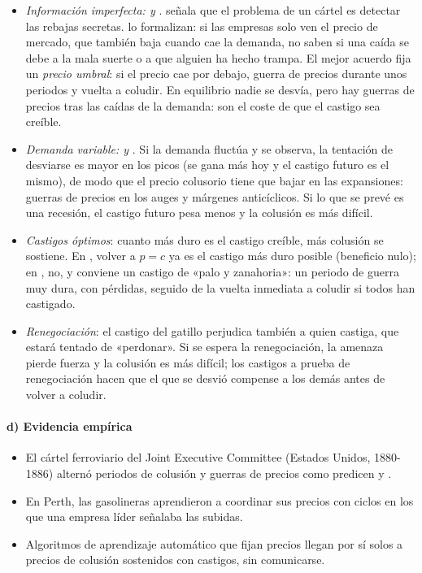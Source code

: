 \documentclass[11pt]{article}
\begin{document}
\begin{itemize}
\item \emph{Información imperfecta:  y }. \textcite{Stigler1964Theory} señala que el problema de un cártel es detectar las rebajas secretas. \textcite{GreenPorter1984Noncooperative} lo formalizan: si las empresas solo ven el precio de mercado, que también baja cuando cae la demanda, no saben si una caída se debe a la mala suerte o a que alguien ha hecho trampa. El mejor acuerdo fija un \emph{precio umbral}: si el precio cae por debajo, guerra de precios durante unos periodos y vuelta a coludir. En equilibrio nadie se desvía, pero hay guerras de precios tras las caídas de la demanda: son el coste de que el castigo sea creíble.
\item \emph{Demanda variable:  y }. Si la demanda fluctúa y se observa, la tentación de desviarse es mayor en los picos (se gana más hoy y el castigo futuro es el mismo), de modo que el precio colusorio tiene que bajar en las expansiones: guerras de precios en los auges y márgenes anticíclicos\nocite{RotembergSaloner1986Supergame}. Si lo que se prevé es una recesión, el castigo futuro pesa menos y la colusión es más difícil\nocite{HaltiwangerHarrington1991Impact}.
\item \emph{Castigos óptimos}\nocite{Abreu1986Extremal,Abreu1988Theory}: cuanto más duro es el castigo creíble, más colusión se sostiene. En , volver a $p=c$ ya es el castigo más duro posible (beneficio nulo); en , no, y conviene un castigo de «palo y zanahoria»: un periodo de guerra muy dura, con pérdidas, seguido de la vuelta inmediata a coludir si todos han castigado.
\item \emph{Renegociación}\nocite{FarrellMaskin1989Renegotiation}: el castigo del gatillo perjudica también a quien castiga, que estará tentado de «perdonar». Si se espera la renegociación, la amenaza pierde fuerza y la colusión es más difícil; los castigos a prueba de renegociación hacen que el que se desvió compense a los demás antes de volver a coludir.
\end{itemize}

\paragraph{d) Evidencia empírica}

\begin{itemize}
\item El cártel ferroviario del Joint Executive Committee (Estados Unidos, 1880-1886) alternó periodos de colusión y guerras de precios como predicen  y \nocite{Porter1983Study}.
\item En Perth, las gasolineras aprendieron a coordinar sus precios con ciclos en los que una empresa líder señalaba las subidas\nocite{ByrneDeRoos2019Learning}.
\item Algoritmos de aprendizaje automático que fijan precios llegan por sí solos a precios de colusión sostenidos con castigos, sin comunicarse\nocite{CalvanoEtAl2020Artificial}.
\end{itemize}
\end{document}
